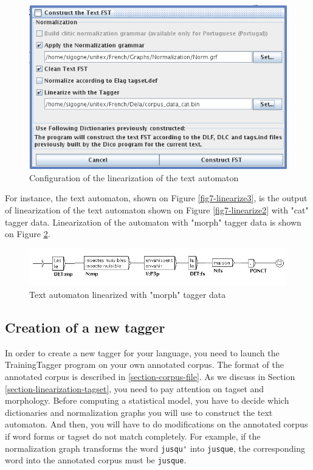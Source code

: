 \begin{figure}[!ht]
\begin{center}
\includegraphics[width=13cm]{resources/img/fig7-linearize1.png}
\caption{Configuration of the linearization of the text automaton\label{fig7-linearize1}}
\end{center}
\end{figure}

\bigskip
\noindent For instance, the text automaton, shown on Figure \ref{fig7-linearize3}, is the output of linearization of the text automaton 
shown on Figure \ref{fig7-linearize2} with "cat" tagger data. 
Linearization of the automaton with "morph" tagger data is shown on Figure \ref{fig7-linearize4}.

\begin{figure}[!ht]
\begin{center}
\includegraphics[width=16cm]{resources/img/fig7-linearize4.png}
\caption{Text automaton linearized with "morph" tagger data\label{fig7-linearize4}}
\end{center}
\end{figure}

\subsection{Creation of a new tagger}
In order to create a new tagger for your language, you need to launch the TrainingTagger program on your own annotated corpus.
The format of the annotated corpus is described in \ref{section-corpus-file}. As we discuss in Section \ref{section-linearization-tagset}, 
you need to pay attention on tagset and morphology. Before computing a statistical model, you have to decide which dictionaries and normalization
graphs you will use to construct the text automaton. And then, you will have to do modifications on the annotated corpus 
if word forms or tagset do not match completely. For example, if the normalization graph transforms the word \verb+jusqu'+ into \verb+jusque+,
 the corresponding word into the annotated corpus must be \verb+jusque+. 

